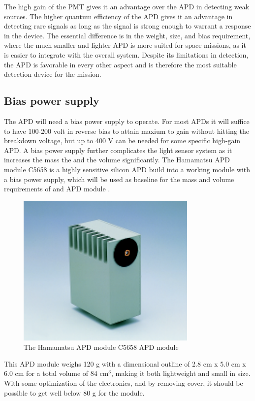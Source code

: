 The high gain of the PMT gives it an advantage over the APD in detecting weak sources. The higher quantum efficiency of the APD gives it an advantage in detecting rare signals as long as the signal is strong enough to warrant a response in the device. The essential difference is in the weight, size, and bias requirement, where the much smaller and lighter APD is more suited for space missions, as it is easier to integrate with the overall system. Despite its limitations in detection, the APD is favorable in every other aspect and is therefore the most suitable detection device for the mission.

\subsection{Bias power supply}
The APD will need a bias power supply to operate. For most APDs it will suffice to have 100-200 volt in reverse bias to attain maxium to gain without hitting the breakdown voltage, but up to 400 V can be needed for some specific high-gain APD. A bias power supply  further complicates the light sensor system as it increases the mass the and the volume significantly. The Hamamatsu APD module C5658 is a highly sensitive silicon APD build into a working module with a bias power supply, which will be used as baseline for the mass and volume requirements of and APD module \cite{APD_module}. 

\begin{figure}[htb]
\begin{center}
\includegraphics[scale=0.8]{figures/RCS/APDmodule}
\caption{The Hamamatsu APD module C5658 APD module \cite{APD_module}}
\label{fig:APD_module}
\end{center}
\end{figure}

This APD module weighs 120 g with a dimensional outline of 2.8 cm x 5.0 cm x 6.0 cm for a total volume of 84 $\mathrm{cm^3}$, making it both lightweight and small in size. With some optimization of the electronics, and by removing cover, it should be possible to get well below 80 g for the module. 

